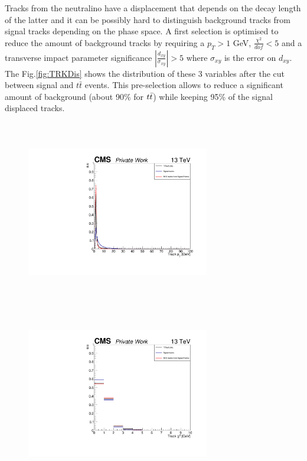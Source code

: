 \documentclass{cernatlasnote}
\begin{document}
        Tracks from the neutralino have a displacement that depends on the decay length of the latter and it can be possibly hard to distinguish background tracks from signal tracks depending on the phase space. A first selection is optimised to reduce the amount of background tracks by requiring a $p_T > 1$  GeV, $\frac{\chi^2}{dof} < 5$ and a transverse impact parameter significance $|\frac{d_{xy}}{\sigma_{xy}}| > 5$ where  $\sigma_{xy}$ is the error on $d_{xy}$. The Fig.\ref{fig:TRKDis} shows the distribution of these 3 variables after the cut between signal and $t\bar{t}$ events. This pre-selection allows to reduce a significant amount of background (about 90\% for $t\Bar{t}$) while keeping 95\% of the signal displaced tracks. \\

        \begin{figure}[ht]
        \centering
        \includegraphics[height=8cm, width=8cm, trim= 0cm 0cm 0cm 0cm,clip]{images/TRK/Track_pt.pdf}
        \includegraphics[height=8cm, width=8cm, trim= 0cm 0cm 0cm 0cm,clip]{images/TRK/Track_chi2.pdf}

\end{figure}
\end{document}
